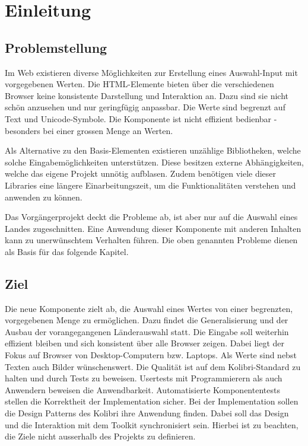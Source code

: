\chapter{Einleitung}
\label{chap:intro}


\section{Problemstellung}
\label{sec:problem}

Im Web existieren diverse Möglichkeiten zur Erstellung eines Auswahl-Input mit vorgegebenen Werten.
Die HTML-Elemente bieten über die verschiedenen Browser keine konsistente Darstellung und Interaktion an.
Dazu sind sie nicht schön anzusehen und nur geringfügig anpassbar. 
Die Werte sind begrenzt auf Text und Unicode-Symbole.
Die Komponente ist nicht effizient bedienbar - besonders bei einer grossen Menge an Werten.

Als Alternative zu den Basis-Elementen existieren unzählige Bibliotheken, welche solche Eingabemöglichkeiten unterstützen.
Diese besitzen externe Abhängigkeiten, welche das eigene Projekt unnötig aufblasen.
Zudem benötigen viele dieser Libraries eine längere Einarbeitungszeit, um die Funktionalitäten verstehen und anwenden zu können.

Das Vorgängerprojekt deckt die Probleme ab, ist aber nur auf die Auswahl eines Landes zugeschnitten.
Eine Anwendung dieser Komponente mit anderen Inhalten kann zu unerwünschtem Verhalten führen.
Die oben genannten Probleme dienen als Basis für das folgende Kapitel.


\section{Ziel}
\label{sec:goal}

Die neue Komponente zielt ab, die Auswahl eines Wertes von einer begrenzten, vorgegebenen Menge zu ermöglichen.
Dazu findet die Generalisierung und der Ausbau der vorangegangenen Länderauswahl statt.
Die Eingabe soll weiterhin effizient bleiben und sich konsistent über alle Browser zeigen.
Dabei liegt der Fokus auf Browser von Desktop-Computern bzw. Laptops.
Als Werte sind nebst Texten auch Bilder wünschenswert.
Die Qualität ist auf dem Kolibri-Standard zu halten und durch Tests zu beweisen.
Usertests mit Programmierern als auch Anwendern beweisen die Anwendbarkeit.
Automatisierte Komponententests stellen die Korrektheit der Implementation sicher.
Bei der Implementation sollen die Design Patterns des Kolibri ihre Anwendung finden.
Dabei soll das Design und die Interaktion mit dem Toolkit synchronisiert sein.
Hierbei ist zu beachten, die Ziele nicht ausserhalb des Projekts zu definieren.


